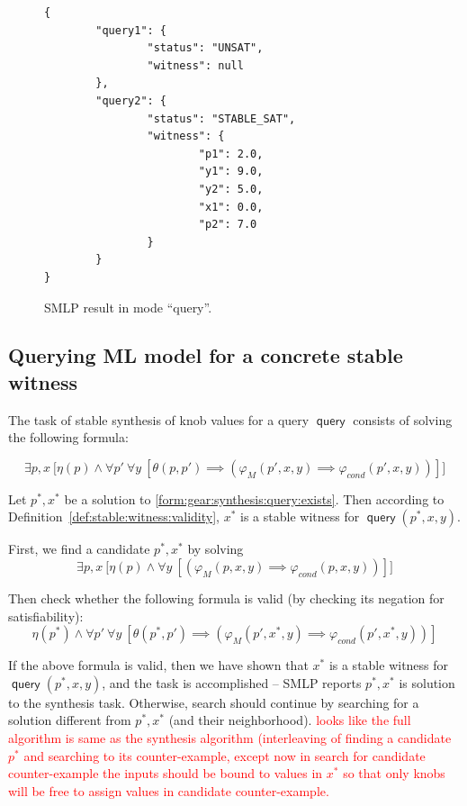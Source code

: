 \documentclass[a4paper,parskip=half]{article} %
\newcommand*\query{\operatorname{\mathsf{query}}}
\newcommand\todozk[1]{\textcolor{red}{#1}}
\newcommand*\ZK{\todozk}
\begin{document}
\begin{figure}
\small
\begin{verbatim}
{
        "query1": {
                "status": "UNSAT",
                "witness": null
        },
        "query2": {
                "status": "STABLE_SAT",
                "witness": {
                        "p1": 2.0,
                        "y1": 9.0,
                        "y2": 5.0,
                        "x1": 0.0,
                        "p2": 7.0
                }
        }
}
\end{verbatim}
\caption{SMLP result in mode ``query''.}\label{fig:query:result}
\end{figure}


\subsection{Querying ML model for a concrete stable witness}


The task of stable synthesis of knob values for a query $\query$ consists of solving the following formula:

\begin{equation}\label{form:gear:synthesis:query:exists}
    \exists p, x ~\big[ \eta(p) \wedge
    \forall p'~
    \forall y~[
    \theta(p,p') \implies (\varphi_M(p',x,y)  \implies  \varphi_{\mathit{cond}}(p',x,y))
    ]\big]
\end{equation} 

Let $p^*, x^*$ be a solution to \cref{form:gear:synthesis:query:exists}. Then according to Definition~\ref{def:stable:witness:validity}, 
$x^*$ is a stable witness for  $\query(p^*, x, y)$. 



First, we find a candidate $p^*, x^*$ by solving
\begin{equation}\label{form:gear:synthesis:query}
    \exists p, x ~\big[ \eta(p) \wedge
    \forall y~[
    (\varphi_M(p,x,y)  \implies  \varphi_{\mathit{cond}}(p,x,y))
    ]\big]
\end{equation} 

Then check whether the following formula is valid (by checking its negation for satisfiability): 
\begin{equation}\label{form:gear:synthesis:query}
    \eta(p^*) \wedge
    \forall p'~
    \forall y~[
    \theta(p^*,p') \implies (\varphi_M(p',x^*,y)  \implies  \varphi_{\mathit{cond}}(p',x^*,y))
    ]
\end{equation} 

If the above formula is valid, then we have shown that $x^*$ is a stable witness for  $\query(p^*, x, y)$, 
and the task is accomplished -- SMLP reports $p^*, x^*$ is solution to the synthesis task. Otherwise,
search should continue by searching for a solution different from $p^*, x^*$ (and their neighborhood).
\ZK{looks like the full algorithm is same as the synthesis algorithm (interleaving of finding a candidate $p^*$
and searching to its counter-example, except now in search for candidate counter-example the inputs should
be bound to values in $x^*$ so that only knobs will be free to assign values in candidate counter-example.}
\end{document}
